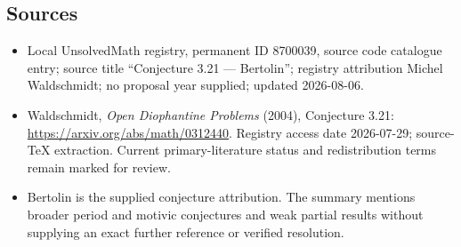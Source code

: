 \documentclass[11pt]{article}
\begin{document}
\subsection{Sources}
\begin{itemize}
\item Local UnsolvedMath registry, permanent ID 8700039, source code catalogue entry; source title ``Conjecture 3.21 --- Bertolin''; registry attribution Michel Waldschmidt; no proposal year supplied; updated 2026-08-06.
\item Waldschmidt, \emph{Open Diophantine Problems} (2004), Conjecture 3.21: \url{https://arxiv.org/abs/math/0312440}. Registry access date 2026-07-29; source-TeX extraction. Current primary-literature status and redistribution terms remain marked for review.
\item Bertolin is the supplied conjecture attribution. The summary mentions broader period and motivic conjectures and weak partial results without supplying an exact further reference or verified resolution.
\end{itemize}
\end{document}

